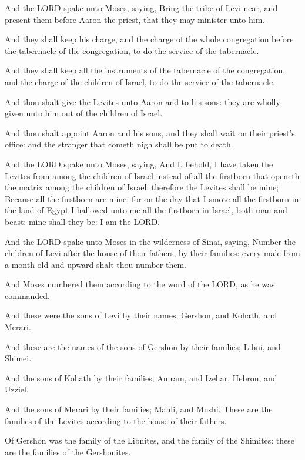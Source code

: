\verse And the LORD spake unto Moses, saying, \verse Bring the tribe of Levi
near, and present them before Aaron the priest, that they may minister
unto him.

\verse And they shall keep his charge, and the charge of the whole
congregation before the tabernacle of the congregation, to do the
service of the tabernacle.

\verse And they shall keep all the instruments of the tabernacle of the
congregation, and the charge of the children of Israel, to do the
service of the tabernacle.

\verse And thou shalt give the Levites unto Aaron and to his sons: they
are wholly given unto him out of the children of Israel.

\verse And thou shalt appoint Aaron and his sons, and they shall wait on
their priest's office: and the stranger that cometh nigh shall be put
to death.

\verse And the LORD spake unto Moses, saying, \verse And I, behold, I have
taken the Levites from among the children of Israel instead of all the
firstborn that openeth the matrix among the children of Israel:
therefore the Levites shall be mine; \verse Because all the firstborn
are mine; for on the day that I smote all the firstborn in the land of
Egypt I hallowed unto me all the firstborn in Israel, both man and
beast: mine shall they be: I am the LORD.

\verse And the LORD spake unto Moses in the wilderness of Sinai, saying,
\verse Number the children of Levi after the house of their fathers, by
their families: every male from a month old and upward shalt thou
number them.

\verse And Moses numbered them according to the word of the LORD, as he
was commanded.

\verse And these were the sons of Levi by their names; Gershon, and
Kohath, and Merari.

\verse And these are the names of the sons of Gershon by their families;
Libni, and Shimei.

\verse And the sons of Kohath by their families; Amram, and Izehar,
Hebron, and Uzziel.

\verse And the sons of Merari by their families; Mahli, and Mushi. These
are the families of the Levites according to the house of their
fathers.

\verse Of Gershon was the family of the Libnites, and the family of the
Shimites: these are the families of the Gershonites.

